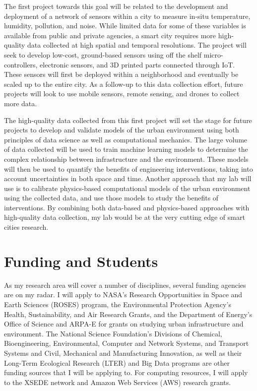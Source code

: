 \documentclass[12pt]{article}
\begin{document}
The first project towards this goal will be related to the development and deployment of a network of sensors within a city to measure in-situ temperature, humidity, pollution, and noise. While limited data for some of these variables is available from public and private agencies, a smart city requires more high-quality data collected at high spatial and temporal resolutions. The project will seek to develop low-cost, ground-based sensors using off the shelf micro-controllers, electronic sensors, and 3D printed parts connected through IoT. These sensors will first be deployed within a neighborhood and eventually be scaled up to the entire city. As a follow-up to this data collection effort, future projects will look to use mobile sensors, remote sensing, and drones to collect more data.

The high-quality data collected from this first project will set the stage for future projects to develop and validate models of the urban environment using both principles of data science as well as computational mechanics. The large volume of data collected will be used to train machine learning models to determine the complex relationship between infrastructure and the environment. These models will then be used to quantify the benefits of engineering interventions, taking into account uncertainties in both space and time. Another approach that my lab will use is to calibrate physics-based computational models of the urban environment using the collected data, and use those models to study the benefits of interventions. By combining both data-based and physics-based approaches with high-quality data collection, my lab would be at the very cutting edge of smart cities research.

\section*{Funding and Students}
As my research area will cover a number of disciplines, several funding agencies are on my radar. I will apply to NASA's Research Opportunities in Space and Earth Sciences (ROSES) program, the Environmental Protection Agency's Health, Sustainability, and Air Research Grants, and the Department of Energy's Office of Science and ARPA-E for grants on studying urban infrastructure and environment. The National Science Foundation's Divisions of Chemical, Bioengineering, Environmental, Computer and Network Systems, and Transport Systems and Civil, Mechanical and Manufacturing Innovation, as well as their Long-Term Ecological Research (LTER) and Big Data programs are other funding sources that I will be applying to. For computing resources, I will apply to the XSEDE network and Amazon Web Services (AWS) research grants. 
\end{document}
